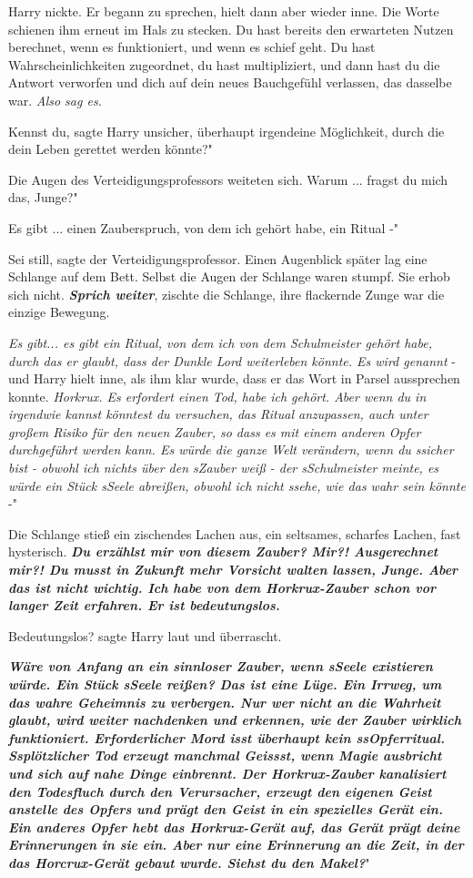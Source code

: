 Harry nickte. Er begann zu sprechen, hielt dann aber wieder inne. Die Worte
schienen ihm erneut im Hals zu stecken. Du hast bereits den erwarteten Nutzen
berechnet, wenn es funktioniert, und wenn es schief geht. Du hast
Wahrscheinlichkeiten zugeordnet, du hast multipliziert, und dann hast du die
Antwort verworfen und dich auf dein neues Bauchgefühl verlassen, das dasselbe
war.
\emph{Also sag es.}

\glqq{}Kennst du\grqq{}, sagte Harry unsicher, \glqq{}überhaupt irgendeine
Möglichkeit, durch die dein Leben gerettet werden könnte?"

Die Augen des Verteidigungsprofessors weiteten sich. \glqq{}Warum ... fragst du
mich das, Junge?"

\glqq{}Es gibt ... einen Zauberspruch, von dem ich gehört habe, ein Ritual -"

\glqq{}Sei still\grqq{}, sagte der Verteidigungsprofessor. Einen Augenblick
später lag eine Schlange auf dem Bett. Selbst die Augen der Schlange waren
stumpf. Sie erhob sich nicht. \glqq{}\textbf{\emph{Sprich weiter}}\grqq{},
zischte die Schlange, ihre flackernde Zunge war die einzige Bewegung.

\glqq{}\emph{Es gibt... es gibt ein Ritual, von dem ich von dem Schulmeister
gehört habe, durch das er glaubt, dass der Dunkle Lord weiterleben könnte. Es
wird genannt} -\grqq{} und Harry hielt inne, als ihm klar wurde, dass er das
Wort in Parsel aussprechen konnte. \glqq{}\emph{Horkrux. Es erfordert einen Tod,
habe ich gehört. Aber wenn du in irgendwie kannst könntest du versuchen, das
Ritual anzupassen, auch unter großem Risiko für den neuen Zauber, so dass es mit
einem anderen Opfer durchgeführt werden kann. Es würde die ganze Welt verändern,
wenn du ssicher bist - obwohl ich nichts über den sZauber weiß - der
sSchulmeister meinte, es würde ein Stück sSeele abreißen, obwohl ich nicht
ssehe, wie das wahr sein könnte} -"

Die Schlange stieß ein zischendes Lachen aus, ein seltsames, scharfes Lachen,
fast hysterisch. \glqq{}\textbf{\emph{Du erzählst mir von diesem Zauber? Mir?!
Ausgerechnet mir?! Du musst in Zukunft mehr Vorsicht walten lassen, Junge. Aber
das ist nicht wichtig. Ich habe von dem Horkrux-Zauber schon vor langer Zeit
erfahren. Er ist bedeutungslos.\grqq{}} }

\glqq{}Bedeutungslos?\grqq{} sagte Harry laut und überrascht.

\glqq{}\textbf{\emph{Wäre von Anfang an ein sinnloser Zauber, wenn sSeele
existieren würde. Ein Stück sSeele reißen? Das ist eine Lüge. Ein Irrweg, um das
wahre Geheimnis zu verbergen. Nur wer nicht an die Wahrheit glaubt, wird weiter
nachdenken und erkennen, wie der Zauber wirklich funktioniert. Erforderlicher
Mord isst überhaupt kein ssOpferritual. Ssplötzlicher Tod erzeugt manchmal
Geissst, wenn Magie ausbricht und sich auf nahe Dinge einbrennt. Der
Horkrux-Zauber kanalisiert den Todesfluch durch den Verursacher, erzeugt den
eigenen Geist anstelle des Opfers und prägt den Geist in ein spezielles Gerät
ein. Ein anderes Opfer hebt das Horkrux-Gerät auf, das Gerät prägt deine
Erinnerungen in sie ein. Aber nur eine Erinnerung an die Zeit, in der das
Horcrux-Gerät gebaut wurde. Siehst du den Makel?}}"

